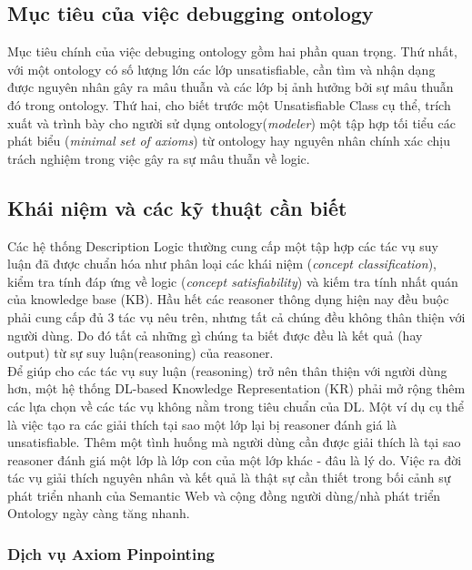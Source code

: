 		
\subsection{Mục tiêu của việc debugging ontology}
Mục tiêu chính của việc debuging ontology gồm hai phần quan trọng. Thứ nhất, với một ontology có số lượng lớn các lớp unsatisfiable, cần tìm và nhận dạng được nguyên nhân gây ra mâu thuẫn và các lớp bị ảnh hưởng bởi sự mâu thuẫn đó trong ontology. Thứ hai, cho biết trước một Unsatisfiable Class cụ thể, trích xuất và trình bày cho người sử dụng ontology(\textit{modeler}) một tập hợp tối tiểu các phát biểu (\textit{minimal set of axioms}) từ ontology hay nguyên nhân chính xác chịu trách nghiệm trong việc gây ra sự mâu thuẫn về logic.
\\
\subsection{Khái niệm và các kỹ thuật cần biết}
Các hệ thống Description Logic thường cung cấp một tập hợp các tác vụ suy luận đã được chuẩn hóa như phân loại các khái niệm (\textit{concept classification}), kiểm tra tính đáp ứng về logic (\textit{concept satisfiability}) và kiếm tra tính nhất quán của knowledge base (KB). Hầu hết các reasoner thông dụng hiện nay đều buộc phải cung cấp đủ 3 tác vụ nêu trên, nhưng tất cả chúng đều không thân thiện với người dùng. Do đó tất cả những gì chúng ta biết được đều là kết quả (hay output) từ sự suy luận(reasoning) của reasoner. 
\\
\hspace*{0.05\textwidth}  Để giúp cho các tác vụ suy luận (reasoning) trở nên thân thiện với người dùng hơn, một hệ thống DL-based Knowledge Representation (KR) phải mở rộng thêm các lựa chọn về các tác vụ không nằm trong tiêu chuẩn của DL. Một ví dụ cụ thể là việc tạo ra các giải thích tại sao một lớp lại bị reasoner đánh giá là unsatisfiable. Thêm một tình huống mà người dùng cần được giải thích là tại sao reasoner đánh giá một lớp là lớp con của một lớp khác - đâu là lý do. Việc ra đời tác vụ giải thích nguyên nhân và kết quả là thật sự cần thiết trong bối cảnh sự phát triển nhanh của Semantic Web và cộng đồng người dùng/nhà phát triển Ontology ngày càng tăng nhanh.
\subsubsection{Dịch vụ Axiom Pinpointing}
